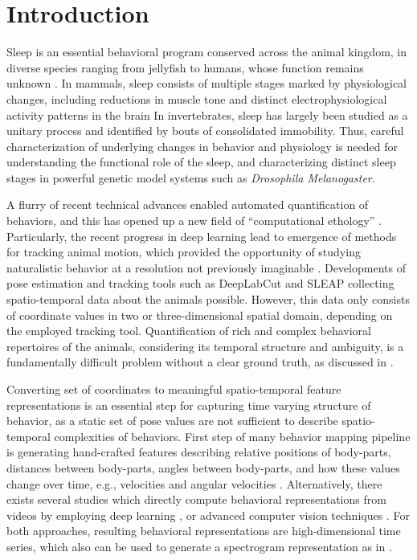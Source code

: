 \setlength{\parindent}{0pt}
\chapter{Introduction}\label{chapter:introduction}
Sleep is an essential behavioral program conserved across the animal kingdom, in diverse species ranging from jellyfish to humans, whose function remains unknown \citep{campbell_animal_1984, nath_jellyfish_2017}.
In mammals, sleep consists of multiple stages marked by physiological changes, including reductions in muscle tone and distinct electrophysiological activity patterns in the brain \citep{corner_sleep_1977, sauer_dynamics_2003} In invertebrates, sleep has largely been studied as a unitary process and identified by bouts of consolidated immobility.
Thus, careful characterization of underlying changes in behavior and physiology is needed for understanding the functional role of the sleep, and characterizing distinct sleep stages in powerful genetic model systems such as \textit{Drosophila Melanogaster}.

A flurry of recent technical advances enabled automated quantification of behaviors, and this has opened up a new field of ``computational ethology'' \citep{anderson_toward_2014, datta_computational_2019}.
Particularly, the recent progress in deep learning lead to emergence of  methods for tracking animal motion, which provided the opportunity of studying naturalistic behavior at a resolution not previously imaginable \citep{pereira_quantifying_2020}.
Developments of pose estimation and tracking tools such as DeepLabCut \citep{mathis_deeplabcut_2018} and SLEAP \citep{pereira_fast_2019, pereira_sleap_2022} collecting spatio-temporal data about the animals possible.
However, this data only consists of coordinate values in two or three-dimensional spatial domain, depending on the employed tracking tool.
Quantification of rich and complex behavioral repertoires of the animals, considering its temporal structure and ambiguity, is a fundamentally difficult problem without a clear ground truth, as discussed in \citet{pereira_quantifying_2020}.

Converting set of coordinates to meaningful spatio-temporal feature representations is an essential step for capturing time varying structure of behavior, as a static set of pose values are not sufficient to describe spatio-temporal complexities of behaviors.
First step of many behavior mapping pipeline is generating hand-crafted features describing relative positions of body-parts, distances between body-parts, angles between body-parts, and how these values change over time, e.g., velocities and angular velocities \citep{kabra_jaaba_2013, hsu_b-soid_2021, marshall_continuous_2021, nilsson_simple_2020}.
Alternatively, there exists several studies which directly compute behavioral representations from videos by employing deep learning \citep{bohnslav_deepethogram_2021}, or advanced computer vision techniques \citep{berman_mapping_2014, wiltschko_mapping_2015}.
For both approaches, resulting behavioral representations are high-dimensional time series, which also can be used to generate a spectrogram representation as in \citet{berman_mapping_2014, todd_systematic_2017, marshall_continuous_2021}.

